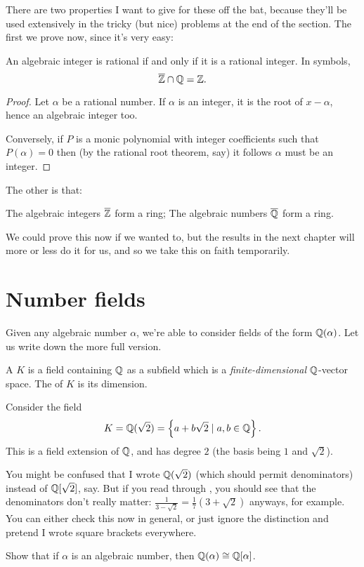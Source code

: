 There are two properties I want to give
for these off the bat,
because they'll be used extensively in the tricky
(but nice) problems at the end of the section.
The first we prove now, since it's very easy:
\begin{proposition}
	An algebraic integer is rational
	if and only if it is a rational integer.
	In symbols, \[ \overline{\mathbb Z} \cap \mathbb Q = \mathbb Z. \]
\end{proposition}
\begin{proof}
	Let $\alpha$ be a rational number.
	If $\alpha$ is an integer, it is the root of $x-\alpha$,
	hence an algebraic integer too.

	Conversely, if $P$ is a monic polynomial with integer
	coefficients such that $P(\alpha) = 0$ then
	(by the rational root theorem, say)
	it follows $\alpha$ must be an integer.
\end{proof}
The other is that:
\begin{proposition}
	The algebraic integers $\overline{\mathbb Z}$ form a ring;
	The algebraic numbers $\overline{\mathbb Q}$ form a ring.
\end{proposition}
We could prove this now if we wanted to,
but the results in the next chapter will more or less
do it for us, and so we take this on faith temporarily.

\section{Number fields}

Given any algebraic number $\alpha$,
we're able to consider fields of the form $\mathbb Q(\alpha)$.
Let us write down the more full version.

\begin{definition}
	A  $K$ is a field containing $\mathbb Q$ as a subfield
	which is a \emph{finite-dimensional} $\mathbb Q$-vector space.
	The  of $K$ is its dimension.
\end{definition}
\begin{example}
	Consider the field
	\[ K = \mathbb Q(\sqrt2) = \left\{ a+b\sqrt2 \mid a,b \in \mathbb Q \right\}. \]
	This is a field extension of $\mathbb Q$,
	and has degree $2$ (the basis being $1$ and $\sqrt2$).
\end{example}

You might be confused that I wrote $\mathbb Q(\sqrt2)$
(which should permit denominators) instead of $\mathbb Q[\sqrt2]$, say.
But if you read through ,
you should see that the denominators don't really matter:
$\frac{1}{3-\sqrt2} = \frac17(3+\sqrt2)$ anyways, for example.
You can either check this now in general,
or just ignore the distinction and pretend I wrote square brackets everywhere.
\begin{exercise}
	[Unimportant]
	Show that if $\alpha$ is an algebraic number,
	then $\mathbb Q(\alpha) \cong \mathbb Q[\alpha]$.
\end{exercise}

